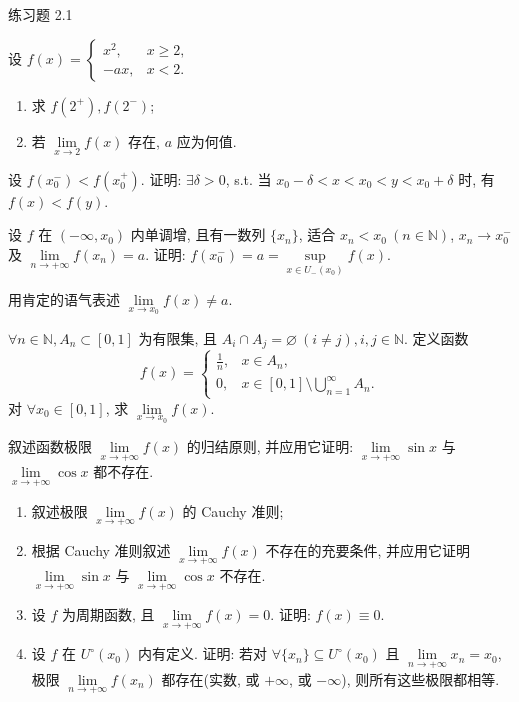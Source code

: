 \begin{exblock}{练习题 2.1}
\begin{enumerate}[label=(\arabic*)]
  \end{enumerate}
  \item 设 $f(x)=\begin{cases} x^{2}, & x\geqslant2, \\ -ax, & x<2. \end{cases}$
  \begin{enumerate}[label=(\arabic*)]
    \item 求 $f(2^{+}), f(2^{-})$;
    \item 若 $\lim\limits_{x\to2}f(x)$ 存在, $a$ 应为何值.
  \end{enumerate}
  \item 设 $f(x_{0}^{-}) < f(x_{0}^{+})$. 证明: $\exists\delta > 0$, s.t. 当 $x_{0} - \delta < x < x_{0} < y < x_{0} + \delta$ 时, 有 $f(x) < f(y)$.
  \item 设 $f$ 在 $(-\infty, x_0)$ 内单调增, 且有一数列 $\{x_n\}$, 适合 $x_n < x_0\ (n \in \mathbb{N})$, $x_n \to x_0^-$ 及 $\lim\limits_{n \to +\infty} f(x_n) = a$. 证明: $f(x_0^-) = a = \sup\limits_{x \in U_-(x_0)} f(x)$.
  \item 用肯定的语气表述 $\lim\limits_{x \to x_{0}} f(x) \neq a$.
  \item $\forall n \in \mathbb{N}, A_n \subset [0,1]$ 为有限集, 且 $A_i \cap A_j = \varnothing\ (i \neq j), i, j \in \mathbb{N}$. 定义函数
  \[
  f(x)=\begin{cases}
  \frac{1}{n}, & x\in A_{n}, \\
  0, & x\in[0,1]\setminus\bigcup\limits_{n=1}^{\infty}A_{n}.
\end{cases}
\]
  对 $\forall x_0\in[0,1]$, 求 $\lim\limits_{x\to x_0}f(x)$.
  \item 叙述函数极限 $\lim\limits_{x \to +\infty} f(x)$ 的归结原则, 并应用它证明: $\lim\limits_{x \to +\infty} \sin x$ 与 $\lim\limits_{x \to +\infty} \cos x$ 都不存在.
  \item \begin{enumerate}[label=(\arabic*)]
    \item 叙述极限 $\lim\limits_{x \to +\infty} f(x)$ 的 Cauchy 准则;
    \item 根据 Cauchy 准则叙述 $\lim\limits_{x \to +\infty} f(x)$ 不存在的充要条件, 并应用它证明 $\lim\limits_{x \to +\infty} \sin x$ 与 $\lim\limits_{x \to +\infty} \cos x$ 不存在.
  \item 设 $f$ 为周期函数, 且 $\lim\limits_{x\to+\infty}f(x)=0$. 证明: $f(x)\equiv0$.
  \item 设 $f$ 在 $U^{\circ}(x_{0})$ 内有定义. 证明: 若对 $\forall \{x_{n}\} \subseteq U^{\circ}(x_{0})$ 且 $\lim\limits_{n\to+\infty}x_{n}=x_{0}$, 极限 $\lim\limits_{n\to+\infty}f(x_{n})$ 都存在(实数, 或 $+\infty$, 或 $-\infty$), 则所有这些极限都相等.

\end{enumerate}
\end{exblock}

